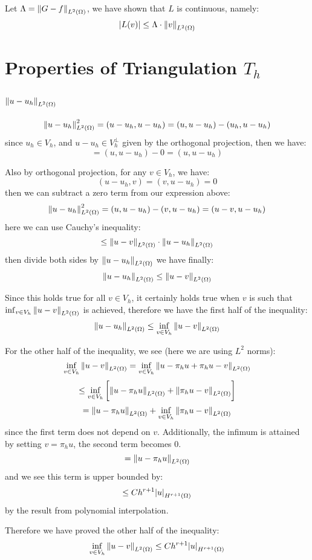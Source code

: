 \documentclass[12pt]{article} %
\newcommand{\1}[1]{\mathds{1}\left[#1\right]}
\begin{document}
Let $\Lambda = \norm{G-f}_{L^2(\Omega)}$, we have shown that $L$ is continuous, namely:
$$
	\abs{L(v)} \le \Lambda\cdot\norm{v}_{L^2(\Omega)}
$$



\section{Properties of Triangulation $T_h$}
\subsection{$\norm{u-u_h}_{L^2(\Omega)}$}
$$
	\norm{u-u_h}_{L^2(\Omega)}^2 = (u-u_h, u-u_h) 
	= (u,u-u_h) - (u_h, u-u_h)
$$ since $u_h\in V_h$, and $u-u_h\in V_h^{\perp}$ given by the orthogonal projection, then we have:
$$
	= (u,u-u_h) - 0 = (u,u-u_h)
$$ 

Also by orthogonal projection, for any $v\in V_h$, we have:
$$
	(u-u_h, v) = (v, u-u_h) = 0
$$ then we can subtract a zero term from our expression above:
$$
	\norm{u-u_h}_{L^2(\Omega)}^2= (u,u-u_h) - (v, u-u_h) = (u-v, u-u_h)
$$ here we can use Cauchy's inequality:
$$
	\le \norm{u-v}_{L^2(\Omega)} \cdot \norm{u-u_h}_{L^2(\Omega)}
$$ then divide both sides by $\norm{u-u_h}_{L^2(\Omega)}$ we have finally:
$$
	\norm{u-u_h}_{L^2(\Omega)} \le \norm{u-v}_{L^2(\Omega)}
$$ 

Since this holds true for all $v\in V_h$, it certainly holds true when $v$ is such that $\inf_{v\in V_h} \norm{u-v}_{L^2(\Omega)}$ is achieved, therefore we have the first half of the inequality:
$$
	\norm{u-u_h}_{L^2(\Omega)} \le \inf_{v\in V_h} \norm{u-v}_{L^2(\Omega)}
$$

For the other half of the inequality, we see (here we are using $L^2$ norms):
$$
	\inf_{v\in V_h}\norm{u - v}_{L^2(\Omega)} = 
	\inf_{v\in V_h}\norm{u - \pi_h u + \pi_h u - v}_{L^2(\Omega)}
$$
$$
	\le \inf_{v\in V_h}\bigg[
	 \norm{u-\pi_h u}_{L^2(\Omega)} + \norm{\pi_h u - v}_{L^2(\Omega)}
	\bigg]
$$
$$
	= \norm{u - \pi_h u}_{L^2(\Omega)} + \inf_{v\in V_h}\norm{\pi_h u -v}_{L^2(\Omega)}
$$ since the first term does not depend on $v$. Additionally, the infimum is attained by setting $v=\pi_hu$, the second term becomes 0.
$$
	= \norm{u - \pi_h u}_{L^2(\Omega)}
$$ and we see this term is upper bounded by:
$$
	\le Ch^{r+1}\abs{u}_{H^{r+1}(\Omega)}
$$ by the result from polynomial interpolation.

Therefore we have proved the other half of the inequality:
$$
	\inf_{v\in V_h}\norm{u - v}_{L^2(\Omega)} \le
	Ch^{r+1}\abs{u}_{H^{r+1}(\Omega)}
$$
\newcommand{\normltwo}[1]{\norm{{#1}}_{L^2(\Omega)}}
\end{document}
